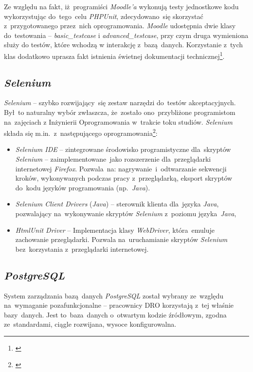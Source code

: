 Ze względu na fakt, iż~programiści \textit{Moodle'a} wykonują testy jednostkowe kodu wykorzystując do~tego~celu \textit{PHPUnit}, zdecydowano~się skorzystać z~przygotowanego przez~nich oprogramowania. \textit{Moodle} udostępnia dwie klasy do~testowania -- \textit{basic\_testcase} i \textit{advanced\_testcase}, przy czym druga wymieniona służy do testów, które wchodzą w interakcję z~bazą~danych. Korzystanie z~tych klas dodatkowo uprasza fakt istnienia świetnej dokumentacji technicznej\footnote{\cite{Man:PHPUnit}}.

\subsection{\textit{Selenium}}
\label{Chapter634}

\textit{Selenium} -- szybko rozwijający~się zestaw narzędzi do~testów akceptacyjnych. Był~to naturalny wybór zwłaszcza, że~zostało ono~przybliżone programistom na~zajęciach z Inżynierii Oprogramowania w~trakcie toku studiów. \textit{Selenium} składa się m.in.~z~następującego oprogramowania\footnote{\cite{Man:Selenium}}:
\begin{itemize}
\item{\textit{Selenium IDE} -- zintegrowane środowisko programistyczne dla~skryptów \textit{Selenium} -- zaimplementowane~jako rozszerzenie dla~przeglądarki internetowej \textit{Firefox}. Pozwala~na: nagrywanie~i~odtwarzanie sekwencji kroków, wykonywanych podczas pracy z~przeglądarką, eksport skryptów do~kodu języków programowania (np.~\textit{Java}).}
\item{\textit{Selenium Client Drivers} (\textit{Java}) -- sterownik klienta dla~języka \textit{Java}, pozwalający na~wykonywanie skryptów \textit{Selenium} z~poziomu języka~\textit{Java}},
\item{\textit{HtmlUnit Driver} -- Implementacja klasy \textit{WebDriver}, która~emuluje zachowanie przeglądarki. Pozwala na~uruchamianie skryptów \textit{Selenium} bez~korzystania z~przeglądarki internetowej.}
\end{itemize}

\subsection{\textit{PostgreSQL}}
\label{Chapter635}

System zarządzania bazą~danych \textit{PostgreSQL} został wybrany ze~względu na~wymaganie pozafunkcjonalne -- pracownicy DRO korzystają z~tej właśnie bazy~danych. Jest to~baza~danych o~otwartym kodzie źródłowym, zgodna ze~standardami, ciągle rozwijana, wysoce konfigurowalna.

